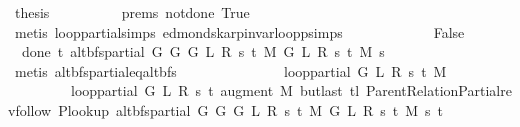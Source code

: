 \begin{isabellebody}
\ {\isacharquery}{\kern0pt}thesis\isanewline
\ \ \ \ \ \ \ \ \isamarkupfalse%
\ {\isachardoublequoteopen}{}{\isachardot}{\kern0pt}prems{\isachardoublequoteclose}\ not{\isacharunderscore}{\kern0pt}done{\isacharunderscore}{\kern0pt}{}\ True\isanewline
\ \ \ \ \ \ \ \ \isamarkupfalse%
\ {\isacharparenleft}{\kern0pt}metis\ loop{\isacharprime}{\kern0pt}{\isacharunderscore}{\kern0pt}partial{\isachardot}{\kern0pt}simps\ edmonds{\isacharunderscore}{\kern0pt}karp{\isacharunderscore}{\kern0pt}invar{\isachardot}{\kern0pt}loop{\isacharprime}{\kern0pt}{\isacharunderscore}{\kern0pt}psimps{\isacharparenright}{\kern0pt}\isanewline
\ \ \ \ \isamarkupfalse%
\isanewline
\ \ \ \ \ \ \isamarkupfalse%
\ False\isanewline
\ \ \ \ \ \ \isamarkupfalse%
\ {\isachardoublequoteopen}{\isasymnot}\ done{\isacharunderscore}{\kern0pt}{}\ t\ {\isacharparenleft}{\kern0pt}alt{\isacharunderscore}{\kern0pt}bfs{\isacharunderscore}{\kern0pt}partial\ {\isacharparenleft}{\kern0pt}G{}\ G\ {\isacharparenleft}{\kern0pt}G{}\ L\ R\ s\ t\ M{\isacharparenright}{\kern0pt}{\isacharparenright}{\kern0pt}\ {\isacharparenleft}{\kern0pt}G{}\ L\ R\ s\ t\ M{\isacharparenright}{\kern0pt}\ s{\isacharparenright}{\kern0pt}{\isachardoublequoteclose}\isanewline
\ \ \ \ \ \ \ \ \isamarkupfalse%
\ {\isacharparenleft}{\kern0pt}metis\ alt{\isacharunderscore}{\kern0pt}bfs{\isacharunderscore}{\kern0pt}partial{\isacharunderscore}{\kern0pt}eq{\isacharunderscore}{\kern0pt}alt{\isacharunderscore}{\kern0pt}bfs{\isacharparenright}{\kern0pt}\isanewline
\ \ \ \ \ \ \isamarkupfalse%
\isanewline
\ \ \ \ \ \ \ \ {\isachardoublequoteopen}loop{\isacharprime}{\kern0pt}{\isacharunderscore}{\kern0pt}partial\ G\ L\ R\ s\ t\ M\ {\isacharequal}{\kern0pt}\isanewline
\ \ \ \ \ \ \ \ \ loop{\isacharprime}{\kern0pt}{\isacharunderscore}{\kern0pt}partial\ G\ L\ R\ s\ t\ {\isacharparenleft}{\kern0pt}augment\ M\ {\isacharparenleft}{\kern0pt}butlast\ {\isacharparenleft}{\kern0pt}tl\ {\isacharparenleft}{\kern0pt}Parent{\isacharunderscore}{\kern0pt}Relation{\isacharunderscore}{\kern0pt}Partial{\isachardot}{\kern0pt}rev{\isacharunderscore}{\kern0pt}follow\ {\isacharparenleft}{\kern0pt}P{\isacharunderscore}{\kern0pt}lookup\ {\isacharparenleft}{\kern0pt}alt{\isacharunderscore}{\kern0pt}bfs{\isacharunderscore}{\kern0pt}partial\ {\isacharparenleft}{\kern0pt}G{}\ G\ {\isacharparenleft}{\kern0pt}G{}\ L\ R\ s\ t\ M{\isacharparenright}{\kern0pt}{\isacharparenright}{\kern0pt}\ {\isacharparenleft}{\kern0pt}G{}\ L\ R\ s\ t\ M{\isacharparenright}{\kern0pt}\ s{\isacharparenright}{\kern0pt}{\isacharparenright}{\kern0pt}\ t{\isacharparenright}{\kern0pt}{\isacharparenright}{\kern0pt}{\isacharparenright}{\kern0pt}{\isacharparenright}{\kern0pt}{\isachardoublequoteclose}\isanewline

\end{isabellebody}
